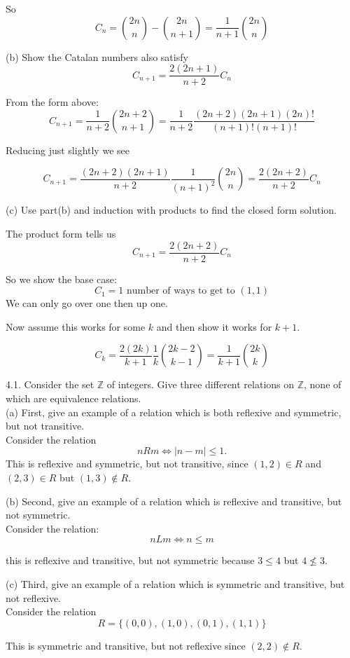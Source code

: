 \documentclass[16 pt]{amsart}
\theoremstyle{definition}
\theoremstyle{remark}
\numberwithin{equation}{subsection}
\newcommand{\Z}{\mathbb{Z}}
\begin{document}
So 
\[
C_n = \binom{2n}{n} - \binom{2n}{n+1} = \frac{1}{n+1}\binom{2n}{n}
\]

(b) Show the Catalan numbers also satisfy
\[
C_{n+1} = \frac{2(2n+1)}{n+2} C_n
\]

From the form above:
\[
C_{n+1} = \frac{1}{n+2}\binom{2n+2}{n+1} = \frac{1}{n+2}\frac{(2n+2)(2n+1)(2n)!}{(n+1)!(n+1)!}
\]


Reducing just slightly we see

\[
C_{n+1} = \frac{(2n+2)(2n+1)}{n+2}\frac{1}{(n+1)^2}\binom{2n}{n} = \frac{2(2n+2)}{n+2}C_n
\]

(c) Use part(b) and induction with products to find the closed form solution.

The product form tells us
\[
C_{n+1} = \frac{2(2n+2)}{n+2} C_n
\]

So we show the base case:
\[
C_1 = 1 \text{ number of ways to get to }(1,1)
\]
We can only go over one then up one.

Now assume this works for some $k$ and then show it works for $k+1$.

\[
C_k = \frac{2(2k)}{k+1}\frac{1}{k}\binom{2k-2}{k-1} = \frac{1}{k+1}\binom{2k}{k}
\]


\newpage

4.1.  Consider the set $\Z$ of integers.  Give three different relations on $\Z$, none of which are equivalence relations.\\

(a) First, give an example of a relation which is both reflexive and symmetric, but not transitive.\\

Consider the relation
\[
nRm \iff |n-m|\le 1.
\]
This is reflexive and symmetric, but not transitive, since $(1,2)\in R$ and $(2,3)\in R$ but $(1,3)\notin R$.


(b) Second, give an example of a relation which is reflexive and transitive, but not symmetric.\\

Consider the relation:
\[
nLm \iff n\le m
\]

this is reflexive and transitive, but not symmetric because $3\le 4$ but $4\not\le 3$.


(c) Third, give an example of a relation which is symmetric and transitive, but not reflexive.\\

Consider the relation
\[
R = \{(0,0),(1,0),(0,1),(1,1)\} 
\]

This is symmetric and transitive, but not reflexive since $(2,2)\notin R$.
\end{document}
